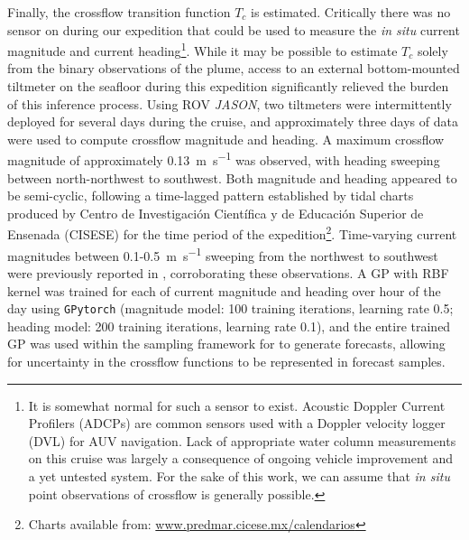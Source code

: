 Finally, the crossflow transition function $T_c$ is estimated. Critically there was no sensor on \Sentry during our expedition that could be used to measure the \emph{in situ} current magnitude and current heading\footnote{It is somewhat normal for such a sensor to exist. Acoustic Doppler Current Profilers (ADCPs) are common sensors used with a Doppler velocity logger (DVL) for AUV navigation. Lack of appropriate water column measurements on this cruise was largely a consequence of ongoing vehicle improvement and a yet untested system. For the sake of this work, we can assume that \emph{in situ} point observations of crossflow is generally possible.}. While it may be possible to estimate $T_c$ solely from the binary observations of the plume, access to an external bottom-mounted tiltmeter on the seafloor during this expedition significantly relieved the burden of this inference process. Using ROV \emph{JASON}, two tiltmeters were intermittently deployed for several days during the cruise, and approximately three days of data were used to compute crossflow magnitude and heading. A maximum crossflow magnitude of approximately \SI{0.13}{\meter\per\second} was observed, with heading sweeping between north-northwest to southwest. Both magnitude and heading appeared to be semi-cyclic, following a time-lagged pattern established by tidal charts produced by Centro de Investigaci\'on Cient\'ifica y de Educaci\'on Superior de Ensenada (CISESE) for the time period of the expedition\footnote{Charts available from: \url{www.predmar.cicese.mx/calendarios}}. Time-varying current magnitudes between 0.1-\SI{0.5}{\meter\per\second} sweeping from the northwest to southwest were previously reported in \cite{scholz2019shelf}, corroborating these observations. A GP with RBF kernel was trained for each of current magnitude and heading over hour of the day using \verb|GPytorch| (magnitude model: 100 training iterations, learning rate 0.5; heading model: 200 training iterations, learning rate 0.1), and the entire trained GP was used within the sampling framework for \PHUMES to generate forecasts, allowing for uncertainty in the crossflow functions to be represented in forecast samples. 

